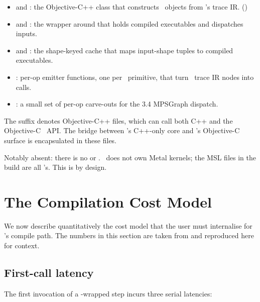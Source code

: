 \begin{itemize}
  \item {} and : the
    Objective-C++ class that constructs \MPSGraph\ objects from
    \Lucid's trace IR. ()
  \item {} and
    : the wrapper around  that
    holds compiled executables and dispatches inputs.
  \item {} and
    : the shape-keyed cache that maps input-shape tuples
    to compiled executables.
  \item {}: per-op emitter
    functions, one per \MPSGraph\ primitive, that turn \Lucid\ trace
    IR nodes into  calls.
  \item {}: a small set of
    per-op carve-outs for the 3.4 MPSGraph dispatch.
\end{itemize}

The  suffix denotes Objective-C++ files, which can call
both C++ and the Objective-C \MPSGraph\ API. The bridge between
\Lucid's C++-only core and \MPSGraph's Objective-C surface is
encapsulated in these files.

Notably absent: there is no  or
. \Lucid\ does not own Metal kernels; the
MSL files in the build are all \MLX's. This is by design.

\section{The Compilation Cost Model}
\label{sec:metal_mpsgraph:compile_cost_model}

We now describe quantitatively the cost model that the user must
internalise for \Lucid's compile path. The numbers in this section
are taken from  and reproduced here
for context.

\subsection{First-call latency}
\label{ssec:metal_mpsgraph:first_call}

The first invocation of a -wrapped step
incurs three serial latencies:

